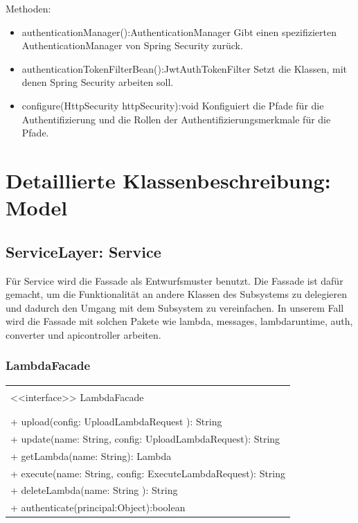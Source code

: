 \documentclass[a4paper,20pt,oneside]{book}
\begin{document}
	Methoden:
	\begin{itemize}
	\item  authenticationManager():AuthenticationManager \linebreak
	Gibt einen spezifizierten AuthenticationManager von Spring Security zurück. 
	\item authenticationTokenFilterBean():JwtAuthTokenFilter\linebreak
	Setzt die Klassen, mit denen Spring Security arbeiten soll.
	\item configure(HttpSecurity httpSecurity):void\linebreak
	Konfiguiert die Pfade für die Authentifizierung und die Rollen der Authentifizierungsmerkmale für die Pfade.
	\end{itemize}
	
	\section{Detaillierte Klassenbeschreibung: Model}
	\subsection{ServiceLayer: Service}
	\raggedright
	Für Service wird die Fassade als Entwurfsmuster 			benutzt. Die Fassade ist dafür gemacht, um die 					Funktionalität an andere Klassen des Subsystems zu 				delegieren und  dadurch den Umgang mit dem Subsystem zu 		vereinfachen. In unserem Fall wird die Fassade mit solchen 		Pakete wie lambda, messages, lambdaruntime, auth, 				converter und apicontroller arbeiten. 
	
	\subsubsection{LambdaFacade}
	
	\centering
	\begin{tabular}{|l|}
	\hline \\
	<<interface>> LambdaFacade \\
	\hline \\
	
	\hline \\

	+ upload(config: UploadLambdaRequest ): String\\
    + update(name: String, config: UploadLambdaRequest): String \\
    + getLambda(name: String): Lambda  \\
    + execute(name: String, config: ExecuteLambdaRequest): String \\
    +  deleteLambda(name: String ): String\\
    + authenticate(principal:Object):boolean\\
	\hline 
	
	\end{tabular}
	
\end{document}
